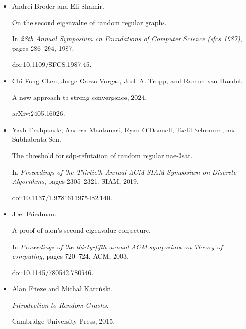 \begin{itemize}
doi:10.1109/FOCS.2015.86.





\item[] 
[10]

Andrei Broder and Eli Shamir.


On the second eigenvalue of random regular graphs.


In \emph{28th Annual Symposium on Foundations of Computer Science
(sfcs 1987)}, pages 286–294, 1987.


doi:10.1109/SFCS.1987.45.





\item[] 
[11]

Chi-Fang Chen, Jorge Garza-Vargas, Joel A. Tropp, and Ramon van Handel.


A new approach to strong convergence, 2024.


arXiv:2405.16026.





\item[] 
[12]

Yash Deshpande, Andrea Montanari, Ryan O’Donnell, Tselil Schramm, and
Subhabrata Sen.


The threshold for sdp-refutation of random regular nae-3sat.


In \emph{Proceedings of the Thirtieth Annual ACM-SIAM Symposium on
Discrete Algorithms}, pages 2305–2321. SIAM, 2019.


doi:10.1137/1.9781611975482.140.





\item[] 
[13]

Joel Friedman.


A proof of alon’s second eigenvalue conjecture.


In \emph{Proceedings of the thirty-fifth annual ACM symposium on
Theory of computing}, pages 720–724. ACM, 2003.


doi:10.1145/780542.780646.





\item[] 
[14]

Alan Frieze and Michał Karoński.


\emph{Introduction to Random Graphs}.


Cambridge University Press, 2015.






\end{itemize}

